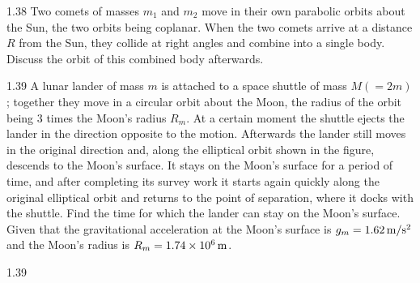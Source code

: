 \begin{problem}{1.38}
Two comets of masses $m_1$ and $m_2$ move in their own parabolic orbits about the Sun, the two orbits being coplanar. When the two comets arrive at a distance $R$ from the Sun, they collide at right angles and combine into a single body. Discuss the orbit of this combined body afterwards.
\end{problem}

\begin{problem}{1.39}
A lunar lander of mass $m$ is attached to a space shuttle of mass $M(=2m)$; together they move in a circular orbit about the Moon, the radius of the orbit being $3$ times the Moon's radius $R_m$. At a certain moment the shuttle ejects the lander in the direction opposite to the motion. Afterwards the lander still moves in the original direction and, along the elliptical orbit shown in the figure, descends to the Moon's surface. It stays on the Moon's surface for a period of time, and after completing its survey work it starts again quickly along the original elliptical orbit and returns to the point of separation, where it docks with the shuttle. Find the time for which the lander can stay on the Moon's surface. Given that the gravitational acceleration at the Moon's surface is $g_m=1.62\,\mathrm{m/s^2}$ and the Moon's radius is $R_m=1.74\times10^6\,\mathrm{m}$.
\end{problem}

\begin{figbox}{1.39}
\end{figbox}

